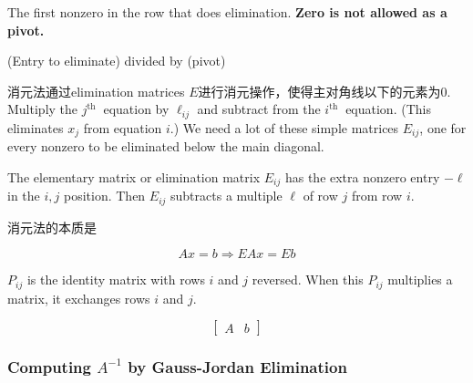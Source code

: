 \begin{definition}[Pivot]
    The first nonzero in the row that does elimination. \textbf{Zero is not allowed as a pivot.}
\end{definition}

\begin{definition}[Multiplier]
    (Entry to eliminate) divided by (pivot)
\end{definition}

消元法通过elimination matrices $E$进行消元操作，使得主对角线以下的元素为0. Multiply the $ j^{\text {th }} $ equation by $ \ell_{i j} $ and subtract from the $ i^{\text {th }} $ equation. (This eliminates $ x_{j} $ from equation $ i $.) We need a lot of these simple matrices $ E_{i j} $, one for every nonzero to be eliminated below the main diagonal.

\begin{definition}
    The elementary matrix or elimination matrix $ E_{i j} $ has the extra nonzero entry $ -\ell $ in the $ i, j $ position. Then $ E_{i j} $ subtracts a multiple $ \ell $ of row $ j $ from row $ i $.
\end{definition}

\begin{theorem}
    消元法的本质是

    \begin{equation}Ax= b \Rightarrow EAx = Eb\end{equation}
\end{theorem}

\begin{definition}
    $  P_{i j} $ is the identity matrix with rows $ i $ and $ j $ reversed. When this  $ P_{i j} $ multiplies a matrix, it exchanges rows $ i $ and $ j $.
\end{definition}

\begin{definition}
    \begin{equation} \left[\begin{matrix}
                A & b
            \end{matrix}\right]\end{equation}
\end{definition}

\subsubsection{Computing $A^{-1}$ by Gauss-Jordan Elimination}

